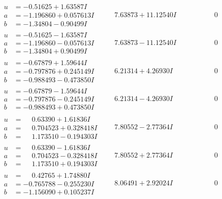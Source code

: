 \documentclass[1p]{elsarticle_modified}
\theoremstyle{definition}
\begin{document}
$$\begin{array}{c|c|c}
\begin{aligned}
u &= -0.51625 + 1.63587 I \\
a &= -1.196860 + 0.057613 I \\
b &= -1.34804 - 0.90499 I\end{aligned}
 & \phantom{-}7.63873 + 11.12540 I & \phantom{-0.000000 } 0 \\ \hline\begin{aligned}
u &= -0.51625 - 1.63587 I \\
a &= -1.196860 - 0.057613 I \\
b &= -1.34804 + 0.90499 I\end{aligned}
 & \phantom{-}7.63873 - 11.12540 I & \phantom{-0.000000 } 0 \\ \hline\begin{aligned}
u &= -0.67879 + 1.59644 I \\
a &= -0.797876 + 0.245149 I \\
b &= -0.988493 - 0.473850 I\end{aligned}
 & \phantom{-}6.21314 + 4.26930 I & \phantom{-0.000000 } 0 \\ \hline\begin{aligned}
u &= -0.67879 - 1.59644 I \\
a &= -0.797876 - 0.245149 I \\
b &= -0.988493 + 0.473850 I\end{aligned}
 & \phantom{-}6.21314 - 4.26930 I & \phantom{-0.000000 } 0 \\ \hline\begin{aligned}
u &= \phantom{-}0.63390 + 1.61836 I \\
a &= \phantom{-}0.704523 + 0.328418 I \\
b &= \phantom{-}1.173510 - 0.194303 I\end{aligned}
 & \phantom{-}7.80552 - 2.77364 I & \phantom{-0.000000 } 0 \\ \hline\begin{aligned}
u &= \phantom{-}0.63390 - 1.61836 I \\
a &= \phantom{-}0.704523 - 0.328418 I \\
b &= \phantom{-}1.173510 + 0.194303 I\end{aligned}
 & \phantom{-}7.80552 + 2.77364 I & \phantom{-0.000000 } 0 \\ \hline\begin{aligned}
u &= \phantom{-}0.42765 + 1.74880 I \\
a &= -0.765788 - 0.255230 I \\
b &= -1.156090 + 0.105237 I\end{aligned}
 & \phantom{-}8.06491 + 2.92024 I & \phantom{-0.000000 } 0\\

\end{array}$$
\end{document}

